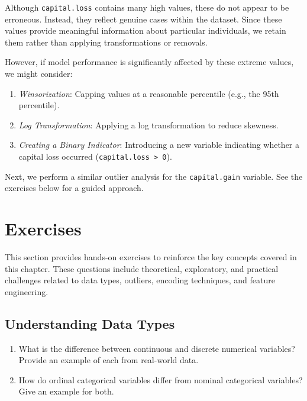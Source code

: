 \documentclass[
]{book}
\newcommand{\passthrough}[1]{#1}
\providecommand{\tightlist}{%
  \setlength{\itemsep}{0pt}\setlength{\parskip}{0pt}}
\theoremstyle{definition}
\theoremstyle{definition}
\theoremstyle{definition}
\theoremstyle{definition}
\theoremstyle{remark}
\begin{document}
Although \passthrough{\lstinline!capital.loss!} contains many high values, these do not appear to be erroneous. Instead, they reflect genuine cases within the dataset. Since these values provide meaningful information about particular individuals, we retain them rather than applying transformations or removals.

However, if model performance is significantly affected by these extreme values, we might consider:

\begin{enumerate}
\def\labelenumi{\arabic{enumi}.}
\tightlist
\item
  \emph{Winsorization}: Capping values at a reasonable percentile (e.g., the 95th percentile).\\
\item
  \emph{Log Transformation}: Applying a log transformation to reduce skewness.\\
\item
  \emph{Creating a Binary Indicator}: Introducing a new variable indicating whether a capital loss occurred (\passthrough{\lstinline!capital.loss > 0!}).
\end{enumerate}

Next, we perform a similar outlier analysis for the \passthrough{\lstinline!capital.gain!} variable. See the exercises below for a guided approach.

\section{Exercises}\label{exercises-1}

This section provides hands-on exercises to reinforce the key concepts covered in this chapter. These questions include theoretical, exploratory, and practical challenges related to data types, outliers, encoding techniques, and feature engineering.

\subsection*{Understanding Data Types}\label{understanding-data-types}

\begin{enumerate}
\def\labelenumi{\arabic{enumi}.}
\tightlist
\item
  What is the difference between continuous and discrete numerical variables? Provide an example of each from real-world data.\\
\item
  How do ordinal categorical variables differ from nominal categorical variables? Give an example for both.
\end{enumerate}
\end{document}

